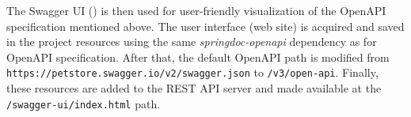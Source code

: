 The Swagger UI () is then used for user-friendly visualization of the OpenAPI specification mentioned above.
The user interface (web site) is acquired and saved in the project resources using the same \emph{springdoc-openapi} dependency as for OpenAPI specification. After that, the default OpenAPI path is modified from \texttt{https://\-petstore.swagger.io\-/v2/swagger\-.json} to \texttt{/v3/open-api}. Finally, these resources are added to the REST API server and made available at the \texttt{/swagger-ui/index.html} path.
